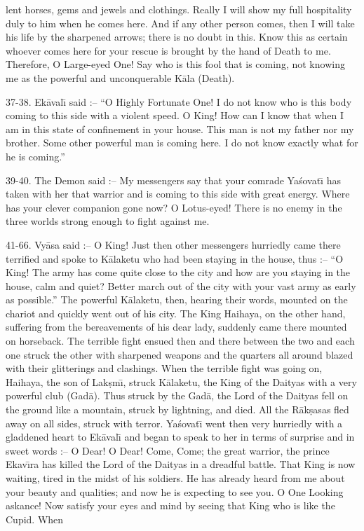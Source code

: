 lent horses, gems and jewels and clothings. Really I will show my full hospitality duly to him when he comes here. And if any other person comes, then I will take his life by the sharpened arrows; there is no doubt in this. Know this as certain whoever comes here for your rescue is brought by the hand of Death to me. Therefore, O Large-eyed One! Say who is this fool that is coming, not knowing me as the powerful and unconquerable K\=ala (Death).

37-38. Ek\=aval\={\i} said :-- ``O Highly Fortunate One! I do not know who is this body coming to this side with a violent speed. O King! How can I know that when I am in this state of confinement in your house. This man is not my father nor my brother. Some other powerful man is coming here. I do not know exactly what for he is coming.''

39-40. The Demon said :-- My messengers say that your comrade Ya\'sovat\={\i} has taken with her that warrior and is coming to this side with great energy. Where has your clever companion gone now? O Lotus-eyed! There is no enemy in the three worlds strong enough to fight against me.

41-66. Vy\=asa said :-- O King! Just then other messengers hurriedly came there terrified and spoke to K\=alaketu who had been staying in the house, thus :-- ``O King! The army has come quite close to the city and how are you staying in the house, calm and quiet? Better march out of the city with your vast army as early as possible.'' The powerful K\=alaketu, then, hearing their words, mounted on the chariot and quickly went out of his city. The King Haihaya, on the other hand, suffering from the bereavements of his dear lady, suddenly came there mounted on horseback. The terrible fight ensued then and there between the two and each one struck the other with sharpened weapons and the quarters all around blazed with their glitterings and clashings. When the terrible fight was going on, Haihaya, the son of Lak\d{s}m\={\i}, struck K\=alaketu, the King of the Daityas with a very powerful club (Gad\=a). Thus struck by the Gad\=a, the Lord of the Daityas fell on the ground like a mountain, struck by lightning, and died. All the R\=ak\d{s}asas fled away on all sides, struck with terror. Ya\'sovat\={\i} went then very hurriedly with a gladdened heart to Ek\=aval\={\i} and began to speak to her in terms of surprise and in sweet words :-- O Dear! O Dear! Come, Come; the great warrior, the prince Ekav\={\i}ra has killed the Lord of the Daityas in a dreadful battle. That King is now waiting, tired in the midst of his soldiers. He has already heard from me about your beauty and qualities; and now he is expecting to see you. O One Looking askance! Now satisfy your eyes and mind by seeing that King who is like the Cupid. When

